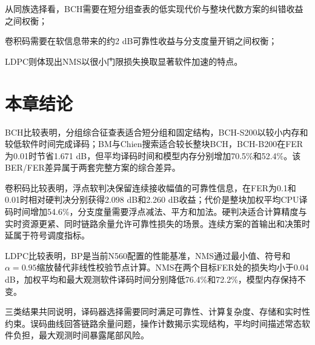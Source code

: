 从同族选择看，BCH需要在短分组查表的低实现代价与整块代数方案的纠错收益之间权衡；

卷积码需要在软信息带来的约2 dB可靠性收益与分支度量开销之间权衡；

LDPC则体现出NMS以很小门限损失换取显著软件加速的特点。

\section{本章结论}

BCH比较表明，分组综合征查表适合短分组和固定结构，BCH-S200以较小内存和较低软件时间完成译码；BM与Chien搜索适合较长整块BCH，BCH-B200在FER为0.01时节省1.671 dB，但平均译码时间和模型内存分别增加70.5\%和52.4\%。该BER/FER差异属于两套完整方案的综合差异。

卷积码比较表明，浮点软判决保留连续接收幅值的可靠性信息，在FER为0.1和0.01时相对硬判决分别获得2.098 dB和2.260 dB收益；代价是整块加权平均CPU译码时间增加54.6\%，分支度量需要浮点减法、平方和加法。硬判决适合计算精度与实时资源更紧、同时链路余量允许可靠性损失的场景。连续方案的首输出和决策时延属于符号调度指标。

LDPC比较表明，BP是当前N560配置的性能基准，NMS通过最小值、符号和$\alpha=0.95$缩放替代非线性校验节点计算。NMS在两个目标FER处的损失均小于0.04 dB，加权平均和最大观测软件译码时间分别降低76.4\%和72.2\%，模型内存保持不变。

三类结果共同说明，译码器选择需要同时满足可靠性、计算复杂度、存储和实时性约束。误码曲线回答链路余量问题，操作计数揭示实现结构，平均时间描述常态软件负担，最大观测时间暴露尾部风险。